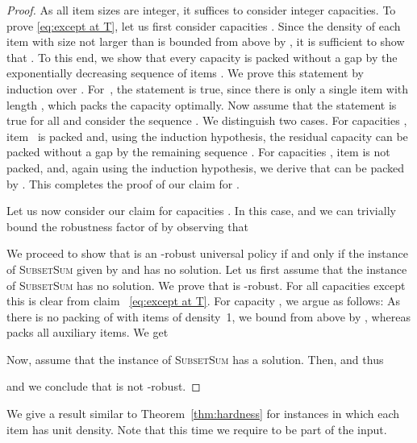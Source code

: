 \documentclass[11pt]{article}
\begin{document}
\begin{proof}
As all item sizes are integer, it suffices to consider integer capacities.
To prove \eqref{eq:except at T}, let us first consider capacities
. Since the density of each item with size not larger
than  is bounded from above by , it is sufficient to show
that . To this end, we show that every capacity
 is packed without a gap by the exponentially
decreasing sequence of items . We prove
this statement by induction over . For~, the statement
is true, since there is only a single item with length , which
packs the capacity  optimally. Now assume that the statement
is true for all  and consider the sequence .
We distinguish two cases. For capacities ,
item~ is packed and, using the induction hypothesis, the
residual capacity 
can be packed without a gap by the remaining sequence .
For capacities , item  is not packed, and, again
using the induction hypothesis, we derive that  can be packed
by . This completes the proof of our claim for
.

Let us now consider our claim for capacities . In this
case,  and we can trivially bound the robustness factor
of  by observing that

 

We proceed to show that  is an -robust universal policy
if and only if the instance of \textsc{SubsetSum} given by  and
 has no solution. Let us first assume that the instance of \textsc{SubsetSum}
has no solution. We prove that  is -robust. For all
capacities except  this is clear from claim~ \eqref{eq:except at T}.
For capacity , we argue as follows: As there is no packing of
 with items of density~1, we bound  from above
by , whereas  packs all auxiliary items.
We get 



Now, assume that the instance of \textsc{SubsetSum} has a solution.
Then,  and thus 

and we conclude that  is not -robust. 
\end{proof}

We give a result similar to Theorem~\ref{thm:hardness} for instances in which each item has unit
density. Note that this time we require  to be part of
the input.

\pagebreak
\end{document}
